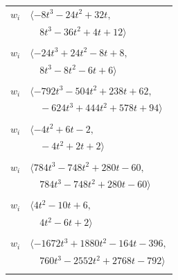 \documentclass[11pt]{article}
\begin{document}
\begin{longtable}{@{}ll@{}}
$w_i$ & $\langle -8t^{3}-24t^{2}+32t,$\\
 & $\quad 8t^{3}-36t^{2}+4t+12\rangle$\\
\addlinespace[2pt]
\multicolumn{2}{@{}p{0.97\textwidth}@{}}{$i=49$, $D_i=2$, $\rho_{ij}$: $8{:}1, \allowbreak 17{:}1, \allowbreak 24{:}2, \allowbreak 26{:}1, \allowbreak 40{:}2, \allowbreak 41{:}2$}\\
$w_i$ & $\langle -24t^{3}+24t^{2}-8t+8,$\\
 & $\quad 8t^{3}-8t^{2}-6t+6\rangle$\\
\addlinespace[2pt]
\multicolumn{2}{@{}p{0.97\textwidth}@{}}{$i=50$, $D_i=2$, $\rho_{ij}$: $0{:}1, \allowbreak 3{:}2, \allowbreak 16{:}2, \allowbreak 21{:}1, \allowbreak 24{:}1, \allowbreak 25{:}2, \allowbreak 37{:}1, \allowbreak 39{:}1, \allowbreak 46{:}1, \allowbreak 53{:}2$}\\
$w_i$ & $\langle -792t^{3}-504t^{2}+238t+62,$\\
 & $\quad -624t^{3}+444t^{2}+578t+94\rangle$\\
\addlinespace[2pt]
\multicolumn{2}{@{}p{0.97\textwidth}@{}}{$i=51$, $D_i=2$, $\rho_{ij}$: $22{:}2, \allowbreak 25{:}2, \allowbreak 27{:}2, \allowbreak 47{:}2$}\\
$w_i$ & $\langle -4t^{2}+6t-2,$\\
 & $\quad -4t^{2}+2t+2\rangle$\\
\addlinespace[2pt]
\multicolumn{2}{@{}p{0.97\textwidth}@{}}{$i=52$, $D_i=16$, $\rho_{ij}$: $2{:}1, \allowbreak 3{:}1, \allowbreak 6{:}2, \allowbreak 12{:}2, \allowbreak 19{:}1, \allowbreak 21{:}2, \allowbreak 25{:}2, \allowbreak 28{:}1, \allowbreak 31{:}1, \allowbreak 36{:}2, \allowbreak 39{:}1, \allowbreak 40{:}1, \allowbreak 44{:}2, \allowbreak 48{:}1$}\\
$w_i$ & $\langle 784t^{3}-748t^{2}+280t-60,$\\
 & $\quad 784t^{3}-748t^{2}+280t-60\rangle$\\
\addlinespace[2pt]
\multicolumn{2}{@{}p{0.97\textwidth}@{}}{$i=53$, $D_i=2$, $\rho_{ij}$: $3{:}1, \allowbreak 19{:}1, \allowbreak 24{:}1, \allowbreak 31{:}1, \allowbreak 50{:}1$}\\
$w_i$ & $\langle 4t^{2}-10t+6,$\\
 & $\quad 4t^{2}-6t+2\rangle$\\
\addlinespace[2pt]
\multicolumn{2}{@{}p{0.97\textwidth}@{}}{$i=54$, $D_i=8$, $\rho_{ij}$: $10{:}1, \allowbreak 15{:}2, \allowbreak 20{:}2, \allowbreak 25{:}1, \allowbreak 31{:}2, \allowbreak 35{:}1, \allowbreak 43{:}1, \allowbreak 44{:}2, \allowbreak 48{:}2$}\\
$w_i$ & $\langle -1672t^{3}+1880t^{2}-164t-396,$\\
 & $\quad 760t^{3}-2552t^{2}+2768t-792\rangle$\\
\addlinespace[2pt]
\end{longtable}
\endgroup
\end{document}
